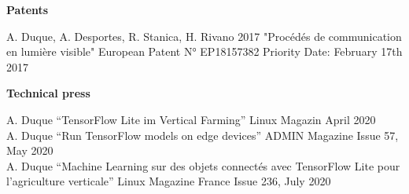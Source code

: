 \documentclass[]{cv-style}          %
\begin{document}
\large{\textbf{Patents}}

\normalsize
\begin{publist}
\pat
{A. Duque, A. Desportes,  R. Stanica, H. Rivano}
{2017}
{"Procédés de communication en lumière visible"}
{European Patent N° EP18157382}
{Priority Date: February 17th 2017}
\\
\end{publist}
\large{\textbf{Technical press}}

\normalsize
\begin{publist}
\pub
  {A. Duque} {“TensorFlow Lite im Vertical Farming”} {Linux Magazin } {April 2020}\\
\pub
  {A. Duque} {“Run TensorFlow models on edge devices”} {ADMIN Magazine} {Issue 57, May 2020}\\
\pub
  {A. Duque} {“Machine Learning sur des objets connectés avec TensorFlow Lite pour l’agriculture verticale”} {Linux Magazine France} {Issue 236, July 2020}
  
\end{publist}





\end{document}
